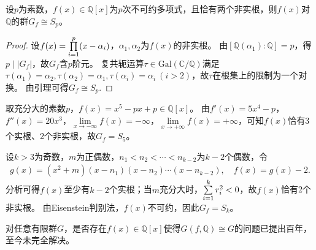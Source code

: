 \documentclass[../../main.tex]{subfiles}%
\begin{document}
\begin{theorem}
设$p$为素数，$f(x)\in\mathbb{Q}[x]$为$p$次不可约多项式，且恰有两个非实根，则$f(x)$对$\mathbb{Q}$的群$G_f\cong S_p$。
\end{theorem}

\begin{proof}
设$f(x)=\prod\limits_{i=1}^p\limits (x-\alpha_i)$，$\alpha_1,\alpha_2$为$f(x)$的非实根。
由$[\mathbb{Q}(\alpha_1):\mathbb{Q}]=p$，得$p\mid |G_f|$，故$G_f$含$p$阶元。
复共轭运算$\tau\in\mathrm{Gal}(\mathbb{C}/\mathbb{Q})$满足$\tau(\alpha_1)=\alpha_2,\tau(\alpha_2)=\alpha_1,\tau(\alpha_i)=\alpha_i\ (i>2)$，故$\tau$在根集上的限制为一个对换。
由引理可得$G_f\cong S_p$.
\end{proof}

\begin{example}
取充分大的素数$p$，$f(x)=x^5-px+p\in\mathbb{Q}[x]$。
由$f'(x)=5x^4-p$，$f''(x)=20x^3$，$\lim\limits_{x\to-\infty}f(x)=-\infty$，$\lim\limits_{x\to+\infty}f(x)=+\infty$，可知$f(x)$恰有3个实根、2个非实根，故$G_f=S_5$。
\end{example}

\begin{example}
设$k>3$为奇数，$m$为正偶数，$n_1<n_2<\cdots<n_{k-2}$为$k-2$个偶数，令
\begin{align*}
g(x)=(x^2+m)(x-n_1)(x-n_2)\cdots(x-n_{k-2}),\quad f(x)=g(x)-2.
\end{align*}
分析可得$f(x)$至少有$k-2$个实根；当$m$充分大时，$\sum\limits_{i=1}^k\limits r_i^2<0$，故$f(x)$恰有2个非实根。
由Eisenstein判别法，$f(x)$不可约，因此$G_f=S_k$。
\end{example}

\begin{remark}
对任意有限群$G$，是否存在$f(x)\in\mathbb{Q}[x]$使得$G(f,\mathbb{Q})\cong G$的问题已提出百年，至今未完全解决。
\end{remark}
\end{document}
